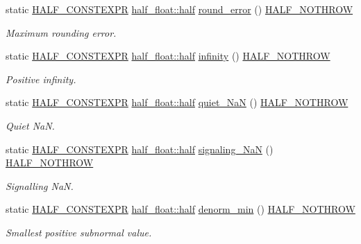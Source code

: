 \begin{DoxyCompactItemize}
static \hyperlink{half_8hpp_ace3116a3e2cd66dd15780b92060987c7}{H\+A\+L\+F\+\_\+\+C\+O\+N\+S\+T\+E\+X\+PR} \hyperlink{classhalf__float_1_1half}{half\+\_\+float\+::half} \hyperlink{classstd_1_1numeric__limits_3_01half__float_1_1half_01_4_a93220b59e5afbdb473c87f7046a95b06}{round\+\_\+error} () \hyperlink{half_8hpp_a76353b496550acb4b523ad263d09908a}{H\+A\+L\+F\+\_\+\+N\+O\+T\+H\+R\+OW}
\begin{DoxyCompactList}\small\item\em Maximum rounding error. \end{DoxyCompactList}\item 
static \hyperlink{half_8hpp_ace3116a3e2cd66dd15780b92060987c7}{H\+A\+L\+F\+\_\+\+C\+O\+N\+S\+T\+E\+X\+PR} \hyperlink{classhalf__float_1_1half}{half\+\_\+float\+::half} \hyperlink{classstd_1_1numeric__limits_3_01half__float_1_1half_01_4_aafcca31b982e48b928c1e6cc318f6e6f}{infinity} () \hyperlink{half_8hpp_a76353b496550acb4b523ad263d09908a}{H\+A\+L\+F\+\_\+\+N\+O\+T\+H\+R\+OW}
\begin{DoxyCompactList}\small\item\em Positive infinity. \end{DoxyCompactList}\item 
static \hyperlink{half_8hpp_ace3116a3e2cd66dd15780b92060987c7}{H\+A\+L\+F\+\_\+\+C\+O\+N\+S\+T\+E\+X\+PR} \hyperlink{classhalf__float_1_1half}{half\+\_\+float\+::half} \hyperlink{classstd_1_1numeric__limits_3_01half__float_1_1half_01_4_a4583df9bd2b496cb47e7c0fa7d1fe7eb}{quiet\+\_\+\+NaN} () \hyperlink{half_8hpp_a76353b496550acb4b523ad263d09908a}{H\+A\+L\+F\+\_\+\+N\+O\+T\+H\+R\+OW}
\begin{DoxyCompactList}\small\item\em Quiet NaN. \end{DoxyCompactList}\item 
static \hyperlink{half_8hpp_ace3116a3e2cd66dd15780b92060987c7}{H\+A\+L\+F\+\_\+\+C\+O\+N\+S\+T\+E\+X\+PR} \hyperlink{classhalf__float_1_1half}{half\+\_\+float\+::half} \hyperlink{classstd_1_1numeric__limits_3_01half__float_1_1half_01_4_ae0451fbc23a2d62bfd9f6bbf7956b4f3}{signaling\+\_\+\+NaN} () \hyperlink{half_8hpp_a76353b496550acb4b523ad263d09908a}{H\+A\+L\+F\+\_\+\+N\+O\+T\+H\+R\+OW}
\begin{DoxyCompactList}\small\item\em Signalling NaN. \end{DoxyCompactList}\item 
static \hyperlink{half_8hpp_ace3116a3e2cd66dd15780b92060987c7}{H\+A\+L\+F\+\_\+\+C\+O\+N\+S\+T\+E\+X\+PR} \hyperlink{classhalf__float_1_1half}{half\+\_\+float\+::half} \hyperlink{classstd_1_1numeric__limits_3_01half__float_1_1half_01_4_ae6c0f9e198bc76d3edd0565e11c63664}{denorm\+\_\+min} () \hyperlink{half_8hpp_a76353b496550acb4b523ad263d09908a}{H\+A\+L\+F\+\_\+\+N\+O\+T\+H\+R\+OW}
\begin{DoxyCompactList}\small\item\em Smallest positive subnormal value. \end{DoxyCompactList}\end{DoxyCompactItemize}
